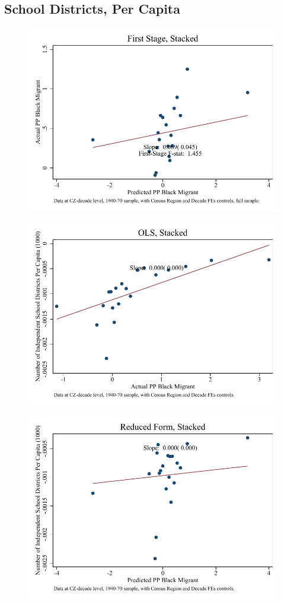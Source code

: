 \documentclass{article}
\begin{document}
\subsection{School Districts, Per Capita}

\clearpage
\begin{figure}
\centering
\includegraphics{figures/simplefigs/stacked_schdist_ind_pc_C3_full_fs.pdf}
\end{figure}
\clearpage
\begin{figure}
\centering
\includegraphics{figures/simplefigs/stacked_schdist_ind_pc_C3_full_ols.pdf}
\end{figure}
\clearpage
\begin{figure}
\centering
\includegraphics{figures/simplefigs/stacked_schdist_ind_pc_C3_full_rf.pdf}
\end{figure}
\clearpage
\end{document}
